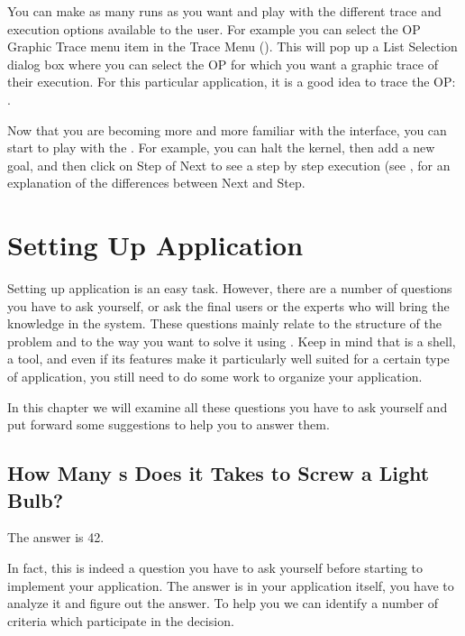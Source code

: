 You can make as many runs as you want and play with the different trace
and execution options available to the user. For example you can select
the OP Graphic Trace menu item in the Trace Menu (). This will pop up a List Selection dialog box where you can
select the OP for which you want a graphic trace of their execution. For
this particular application, it is a good idea to trace the OP:
.

Now that you are becoming more and more familiar with the interface, you
can start to play with the . For example,
you can halt the kernel, then add a new goal, and then click on Step of
Next to see a step by step execution (see , for an explanation of the differences between Next and Step.

\chapter{Setting Up \aCOPRS{} Application}

Setting up \aCOPRS{} application is an easy task. However, there are a number
of questions you have to ask yourself, or ask the final users or the experts
who will bring the knowledge in the system. These questions mainly relate to
the structure of the problem and to the way you want to solve it using \COPRS{}.
Keep in mind that \COPRS{} is a shell, a tool, and even if its features make
it particularly well suited for a certain type of application, you still need
to do some work to organize your application.

In this chapter we will examine all these questions you have to ask
yourself and put forward some suggestions to help you to answer them.



\section{How Many \CPK{}s Does it Takes to Screw a Light Bulb?}

The answer is 42.

In fact, this is indeed a question you have to ask yourself before
starting to implement your \COPRS{} application. The answer is in your
application itself, you have to analyze it and figure out the answer. To
help you we can identify a number of criteria which participate in the
decision.

